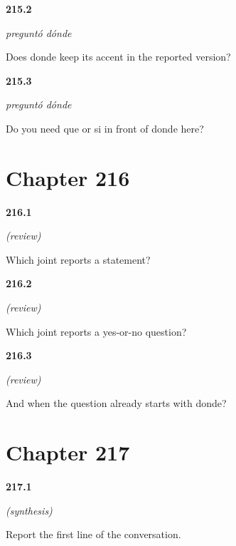 \noindent\begin{minipage}[t]{\linewidth}
\raggedright
\hypertarget{review-ES-C57-pregunto-donde-accent}{\textbf{215.2}} \emph{preguntó dónde}\par
\small Does donde keep its accent in the reported version?
\end{minipage}\par\medskip

\noindent\begin{minipage}[t]{\linewidth}
\raggedright
\hypertarget{review-ES-C57-pregunto-donde-join}{\textbf{215.3}} \emph{preguntó dónde}\par
\small Do you need que or si in front of donde here?
\end{minipage}\par\medskip

\section*{Chapter 216}

\noindent\begin{minipage}[t]{\linewidth}
\raggedright
\hypertarget{review-ES-C57-repaso-reportar-que}{\textbf{216.1}} \emph{(review)}\par
\small Which joint reports a statement?
\end{minipage}\par\medskip

\noindent\begin{minipage}[t]{\linewidth}
\raggedright
\hypertarget{review-ES-C57-repaso-reportar-si}{\textbf{216.2}} \emph{(review)}\par
\small Which joint reports a yes-or-no question?
\end{minipage}\par\medskip

\noindent\begin{minipage}[t]{\linewidth}
\raggedright
\hypertarget{review-ES-C57-repaso-reportar-wh}{\textbf{216.3}} \emph{(review)}\par
\small And when the question already starts with donde?
\end{minipage}\par\medskip

\section*{Chapter 217}

\noindent\begin{minipage}[t]{\linewidth}
\raggedright
\hypertarget{review-ES-C57-sintesis-reportar-one}{\textbf{217.1}} \emph{(synthesis)}\par
\small Report the first line of the conversation.
\end{minipage}\par\medskip

